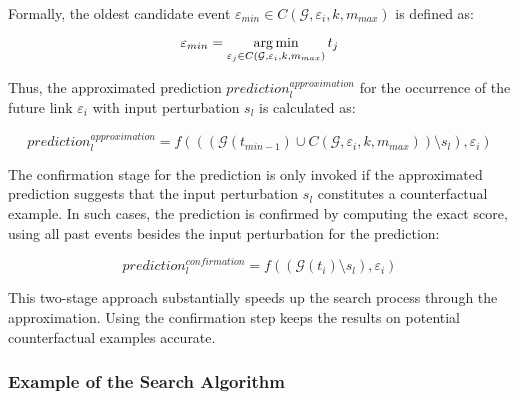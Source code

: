Formally, the oldest candidate event $\varepsilon_{min} \in C(\mathcal{G}, \varepsilon_i, k, m_{max})$ is defined as:

\begin{equation}
    \varepsilon_{min} = \operatorname*{arg\,min}_{\varepsilon_j \in C(\mathcal{G}, \varepsilon_i, k, m_{max})} t_j
\end{equation}

Thus, the approximated prediction $prediction_l^{approximation}$ for the occurrence of the future link $\varepsilon_i$ with input perturbation $s_l$ is calculated as: 

\begin{equation}
    prediction_l^{approximation} = f(((\mathcal{G}(t_{min - 1}) \cup C(\mathcal{G}, \varepsilon_i, k, m_{max})) \setminus s_l), \varepsilon_i)
\end{equation}

The confirmation stage for the prediction is only invoked if the approximated prediction suggests that the input perturbation $s_l$ constitutes a counterfactual example. In such cases, the prediction is confirmed by computing the exact score, using all past events besides the input perturbation for the prediction:

\begin{equation}
    prediction_l^{confirmation} = f((\mathcal{G}(t_i) \setminus s_l), \varepsilon_i)
\end{equation}

This two-stage approach substantially speeds up the search process through the approximation. Using the confirmation step keeps the results on potential counterfactual examples accurate.

\FloatBarrier
\subsubsection{Example of the Search Algorithm}
\label{s_Methodology_CoDy_Example}

